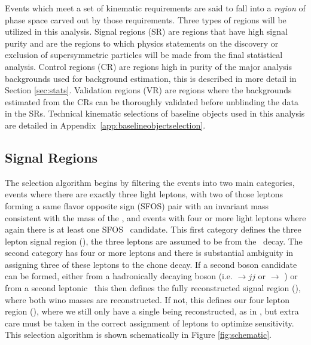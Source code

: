 Events which meet a set of kinematic requirements are said to fall into a  \emph{region} of phase space carved out by those requirements.
Three types of regions will be utilized in this analysis.
Signal regions (SR) are regions that have high signal purity and are the regions to which physics statements on the discovery or exclusion of supersymmetric particles will be made from the final statistical analysis. 
Control regions (CR) are regions high in purity of the major analysis backgrounds used for background estimation, this is described in more detail in Section \ref{sec:stats}. 
Validation regions (VR) are regions where the backgrounds estimated from the CRs can be thoroughly validated before unblinding the data in the SRs.
Technical kinematic selections of baseline objects used in this analysis are detailed in Appendix~\ref{app:baselineobjectselection}.

\subsection{Signal Regions}
The selection algorithm begins by filtering the events into two main categories, events where there are exactly three light leptons, with two of those leptons forming a same flavor opposite sign (SFOS) pair with an invariant mass consistent with the mass of the \Zboson, and events with four or more light leptons where again there is at least one SFOS \Zboson\ candidate.
This first category defines the three lepton signal region (\SRThree), the three leptons are assumed to be from the \chone\ decay.
The second category has four or more leptons and there is substantial ambiguity in assigning three of these leptons to the chone decay. 
If a second boson candidate can be formed, either from a hadronically decaying boson (i.e. \Wboson$\rightarrow jj$ or \Hboson $\rightarrow$ \bbbar) or from a second leptonic \Zboson\ this then defines the fully reconstructed signal region (\SRFR), where both wino masses are reconstructed.
If not, this defines our four lepton region (\SRFour), where we still only have a single \chono being reconstructed, as in \SRThree, but extra care must be taken in the correct assignment of leptons to optimize sensitivity.
This selection algorithm is shown schematically in Figure \ref{fig:schematic}.

